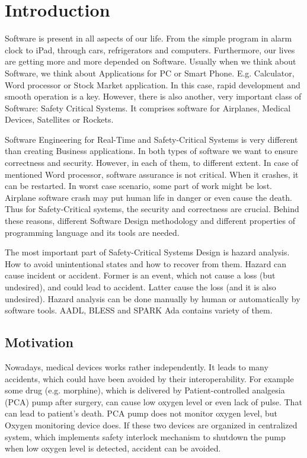 
\cleardoublepage


\chapter{Introduction}
\label{introduction}

Software is present in all aspects of our life. From the simple program in alarm clock to iPad, through cars, refrigerators and computers. Furthermore, our lives are getting more and more depended on Software. Usually when we think about Software, we think about Applications for PC or Smart Phone. E.g. Calculator, Word processor or Stock Market application. In this case, rapid development and smooth operation is a key. However, there is also another, very important class of Software: Safety Critical Systems. It comprises software for Airplanes, Medical Devices, Satellites or Rockets.

Software Engineering for Real-Time and Safety-Critical Systems is very different than creating Business applications. In both types of software we want to ensure correctness and security. However, in each of them, to different extent. In case of mentioned Word processor, software assurance is not critical. When it crashes, it can be restarted. In worst case scenario, some part of work might be lost. Airplane software crash may put human life in danger or even cause the death. Thus for Safety-Critical systems, the security and correctness are crucial. Behind these reasons, different Software Design methodology and different properties of programming language and its tools are needed.

The most important part of Safety-Critical Systems Design is hazard analysis. How to avoid unintentional states and how to recover from them. Hazard can cause incident or accident. Former is an event, which not cause a loss (but undesired), and could lead to accident. Latter cause the loss (and it is also undesired). Hazard analysis can be done manually by human or automatically by software tools. AADL, BLESS and SPARK Ada contains variety of them.


\section{Motivation}
\label{introduction:motivation}

Nowadays, medical devices works rather independently. It leads to many accidents, which could have been avoided by their interoperability. For example some drug (e.g. morphine), which is delivered by Patient-controlled analgesia (PCA) pump after surgery, can cause low oxygen level or even lack of pulse. That can lead to patient's death. PCA pump does not monitor oxygen level, but Oxygen monitoring device does. If these two devices are organized in centralized system, which implements safety interlock mechanism to shutdown the pump when low oxygen level is detected, accident can be avoided. 

